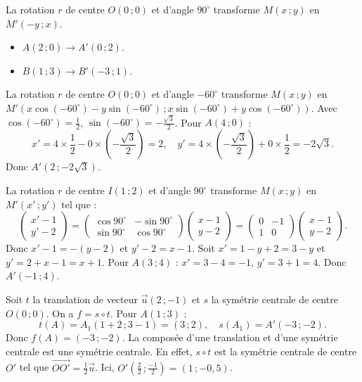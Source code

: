 La rotation \(r\) de centre \(O(0\,; 0)\) et d'angle \(90^\circ\) transforme \(M(x\,; y)\) en \(M'(-y\,; x)\).

\begin{itemize}
    \item \(A(2\,; 0) \to A'(0\,; 2)\).
    \item \(B(1\,; 3) \to B'(-3\,; 1)\).
\end{itemize}

La rotation \(r\) de centre \(O(0\,; 0)\) et d'angle \(-60^\circ\) transforme \(M(x\,; y)\) en \(M'(x\cos(-60^\circ) - y\sin(-60^\circ)\,; x\sin(-60^\circ) + y\cos(-60^\circ))\).
Avec \(\cos(-60^\circ) = \frac{1}{2}\), \(\sin(-60^\circ) = -\frac{\sqrt{3}}{2}\).
Pour \(A(4\,; 0)\) :
\[
x' = 4 \times \frac{1}{2} - 0 \times \left(-\frac{\sqrt{3}}{2}\right) = 2, \quad y' = 4 \times \left(-\frac{\sqrt{3}}{2}\right) + 0 \times \frac{1}{2} = -2\sqrt{3}.
\]
Donc \(A'(2\,; -2\sqrt{3})\).

La rotation \(r\) de centre \(I(1\,; 2)\) et d'angle \(90^\circ\) transforme \(M(x\,; y)\) en \(M'(x'\,; y')\) tel que :
\[
\begin{pmatrix} x' - 1 \\ y' - 2 \end{pmatrix} = \begin{pmatrix} \cos 90^\circ & -\sin 90^\circ \\ \sin 90^\circ & \cos 90^\circ \end{pmatrix} \begin{pmatrix} x - 1 \\ y - 2 \end{pmatrix} = \begin{pmatrix} 0 & -1 \\ 1 & 0 \end{pmatrix} \begin{pmatrix} x - 1 \\ y - 2 \end{pmatrix}.
\]
Donc \(x' - 1 = -(y - 2)\) et \(y' - 2 = x - 1\). Soit \(x' = 1 - y + 2 = 3 - y\) et \(y' = 2 + x - 1 = x + 1\).
Pour \(A(3\,; 4)\) : \(x' = 3 - 4 = -1\), \(y' = 3 + 1 = 4\). Donc \(A'(-1\,; 4)\).

Soit \(t\) la translation de vecteur \(\vec{u}(2\,; -1)\) et \(s\) la symétrie centrale de centre \(O(0\,; 0)\). On a \(f = s \circ t\).
Pour \(A(1\,; 3)\) :
\[
t(A) = A_1(1+2\,; 3-1) = (3\,; 2), \quad s(A_1) = A'(-3\,; -2).
\]
Donc \(f(A) = (-3\,; -2)\).
La composée d'une translation et d'une symétrie centrale est une symétrie centrale. En effet, \(s \circ t\) est la symétrie centrale de centre \(O'\) tel que \(\overrightarrow{OO'} = \frac{1}{2} \vec{u}\). Ici, \(O'(\frac{2}{2}\,; \frac{-1}{2}) = (1\,; -0,5)\).

